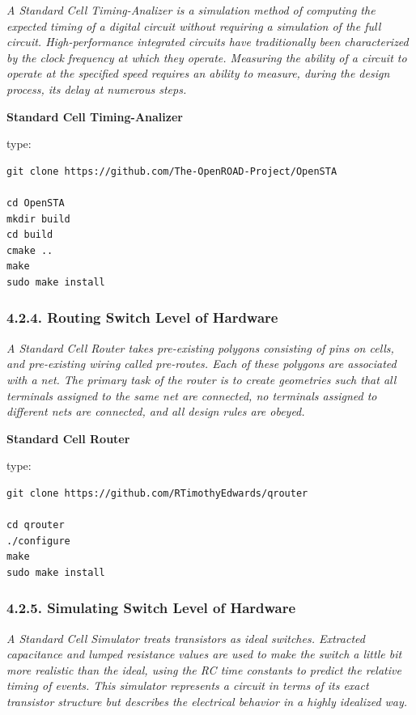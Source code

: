 \documentclass[
]{article}
\begin{document}
\emph{A Standard Cell Timing-Analizer is a simulation method of
computing the expected timing of a digital circuit without requiring a
simulation of the full circuit. High-performance integrated circuits
have traditionally been characterized by the clock frequency at which
they operate. Measuring the ability of a circuit to operate at the
specified speed requires an ability to measure, during the design
process, its delay at numerous steps.}

\textbf{Standard Cell Timing-Analizer}

type:

\begin{verbatim}
git clone https://github.com/The-OpenROAD-Project/OpenSTA

cd OpenSTA
mkdir build
cd build
cmake ..
make
sudo make install
\end{verbatim}

\hypertarget{routing-switch-level-of-hardware-1}{%
\subsubsection{4.2.4. Routing Switch Level of
Hardware}\label{routing-switch-level-of-hardware-1}}

\emph{A Standard Cell Router takes pre-existing polygons consisting of
pins on cells, and pre-existing wiring called pre-routes. Each of these
polygons are associated with a net. The primary task of the router is to
create geometries such that all terminals assigned to the same net are
connected, no terminals assigned to different nets are connected, and
all design rules are obeyed.}

\textbf{Standard Cell Router}

type:

\begin{verbatim}
git clone https://github.com/RTimothyEdwards/qrouter

cd qrouter
./configure
make
sudo make install
\end{verbatim}

\hypertarget{simulating-switch-level-of-hardware-1}{%
\subsubsection{4.2.5. Simulating Switch Level of
Hardware}\label{simulating-switch-level-of-hardware-1}}

\emph{A Standard Cell Simulator treats transistors as ideal switches.
Extracted capacitance and lumped resistance values are used to make the
switch a little bit more realistic than the ideal, using the RC time
constants to predict the relative timing of events. This simulator
represents a circuit in terms of its exact transistor structure but
describes the electrical behavior in a highly idealized way.}
\end{document}
